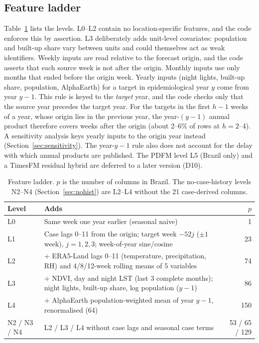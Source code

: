 \documentclass[11pt]{article}
\begin{document}
\subsection{Feature ladder}
Table~\ref{tab:ladder} lists the levels. L0--L2 contain no location-specific features, and the code
enforces this by assertion. L3 deliberately adds unit-level covariates: population and built-up share
vary between units and could themselves act as weak identifiers. Weekly inputs are read relative to the
forecast origin, and the code asserts that each source week is not after the origin. Monthly inputs use
only months that ended before the origin week. Yearly inputs (night lights, built-up share, population,
AlphaEarth) for a target in epidemiological year $y$ come from year $y-1$. This rule is keyed to the
\emph{target} year, and the code checks only that the source year precedes the target year. For the
targets in the first $h-1$ weeks of a year, whose origin lies in the previous year, the year-$(y-1)$
annual product therefore covers weeks after the origin (about 2--6\% of rows at $h=2$--4). A
sensitivity analysis keys yearly inputs to the origin year instead (Section~\ref{sec:sensitivity}).
The year-$y-1$ rule also does not account for the delay with which annual products are published.
The PDFM level L5 (Brazil only) and a TimesFM residual hybrid are deferred to a
later version (D10).

\begin{table}[t]
\centering\small
\caption{Feature ladder. $p$ is the number of columns in Brazil. The no-case-history levels N2--N4
(Section~\ref{sec:nohist}) are L2--L4 without the 21 case-derived columns.}
\label{tab:ladder}
\begin{tabular}{llr}
\toprule
Level & Adds & $p$ \\
\midrule
L0 & Same week one year earlier (seasonal naive) & 1 \\
L1 & Case lags 0--11 from the origin; target week $-52j$ ($\pm 1$ week), $j=1,2,3$; week-of-year sine/cosine & 23 \\
L2 & + ERA5-Land lags 0--11 (temperature, precipitation, RH) and 4/8/12-week rolling means of 5 variables & 74 \\
L3 & + NDVI, day and night LST (last 3 complete months); night lights, built-up share, log population ($y-1$) & 86 \\
L4 & + AlphaEarth population-weighted mean of year $y-1$, renormalised (64) & 150 \\
\midrule
N2 / N3 / N4 & L2 / L3 / L4 without case lags and seasonal case terms & 53 / 65 / 129 \\
\bottomrule
\end{tabular}
\end{table}
\end{document}
